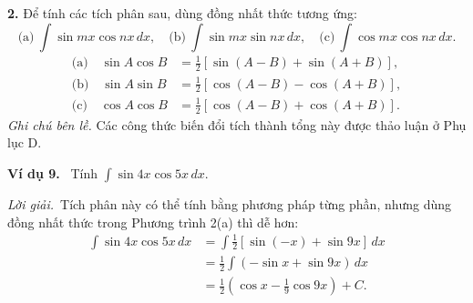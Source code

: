 \documentclass[12pt,a4paper]{article}
\newcommand{\ex}[1]{\par\medskip\noindent\textbf{Ví dụ #1.}\ }
\newcommand{\sol}{\par\nopagebreak[4]\noindent\textit{Lời giải.}\ }
\begin{document}
\noindent\textbf{2.} Để tính các tích phân sau, dùng đồng nhất thức tương ứng:
\[
\text{(a)}\ \int\sin mx\cos nx\,dx,\quad
\text{(b)}\ \int\sin mx\sin nx\,dx,\quad
\text{(c)}\ \int\cos mx\cos nx\,dx.
\]
\begin{align*}
\text{(a)}\quad\sin A\cos B&=\frac12[\sin(A-B)+\sin(A+B)],\\
\text{(b)}\quad\sin A\sin B&=\frac12[\cos(A-B)-\cos(A+B)],\\
\text{(c)}\quad\cos A\cos B&=\frac12[\cos(A-B)+\cos(A+B)].
\end{align*}
\textit{Ghi chú bên lề.} Các công thức biến đổi tích thành tổng này được thảo luận ở Phụ lục D.

\ex{9} Tính $\displaystyle\int\sin4x\cos5x\,dx$.
\sol Tích phân này có thể tính bằng phương pháp từng phần, nhưng dùng đồng nhất thức trong Phương trình 2(a) thì dễ hơn:
\begin{align*}
\int\sin4x\cos5x\,dx&=\int\frac12[\sin(-x)+\sin9x]\,dx\\
&=\frac12\int(-\sin x+\sin9x)\,dx\\
&=\frac12\left(\cos x-\frac19\cos9x\right)+C.
\end{align*}

\clearpage
\end{document}
